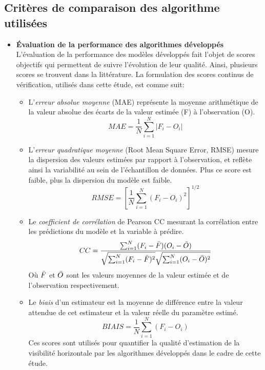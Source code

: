 \subsection{Critères de comparaison des algorithme utilisées}\label{dig_algo_perf}
\begin{itemize}
\item[\ding{233}] \textbf{Évaluation de la performance des algorithmes développés}\\

L’évaluation de la performance des modèles développés fait l’objet de scores objectifs qui permettent de
suivre l’évolution de leur qualité. Ainsi, plusieurs scores se trouvent dans la littérature. La formulation des scores continus de vérification, utilisés dans cette étude, est comme suit:\\

\begin{itemize}
    \item[\ding{109}] L’\textit{erreur absolue moyenne} (MAE) représente la moyenne arithmétique de la valeur absolue des écarts de la valeur estimée (F) à l’observation (O).
    \begin{equation}
        MAE = \frac{1}{N} \sum_{i=1}^{N}\lvert F_{i}-O_{i} \rvert
    \end{equation}
    \item[\ding{109}]  L’\textit{erreur quadratique moyenne} (Root Mean Square Error, RMSE) mesure la dispersion des valeurs estimées par rapport à l’observation, et reflète ainsi la variabilité au sein de l’échantillon de données. Plus ce score est faible, plus la dispersion du modèle est faible.
    \begin{equation}
        RMSE = \left[ \frac{1}{N} \sum_{i=1}^{N} (F_{i}-O_{i})^2  \right]^{1/2}
    \end{equation}
    \item[\ding{109}] Le \textit{coefficient de corrélation} de Pearson CC mesurant la corrélation entre les prédictions du modèle et la variable à prédire.
    \begin{equation}
        CC = \frac{\sum_{i=1}^{N} (F_{i}-\Bar{F})(O_{i}-\Bar{O})}{\sqrt{\sum_{i=1}^{N} (F_{i}-\Bar{F})^2}\sqrt{\sum_{i=1}^{N} (O_{i}-\Bar{O})^2}}
    \end{equation}
    Où $\Bar{F}$ et $\Bar{O}$ sont les valeurs moyennes de la valeur estimée et de l'observation respectivement.
    \item[\ding{109}] Le \textit{biais} d'un estimateur est la moyenne de différence entre la valeur attendue de cet estimateur et la valeur réelle du paramètre estimé.
    \begin{equation}
        BIAIS = \frac{1}{N} \sum_{i=1}^{N}(F_{i}-O_{i})
    \end{equation}
    Ces scores sont utilisés pour quantifier la qualité d'estimation de la visibilité horizontale par les algorithmes développés dans le cadre de cette étude.\\
\end{itemize}


\end{itemize}
